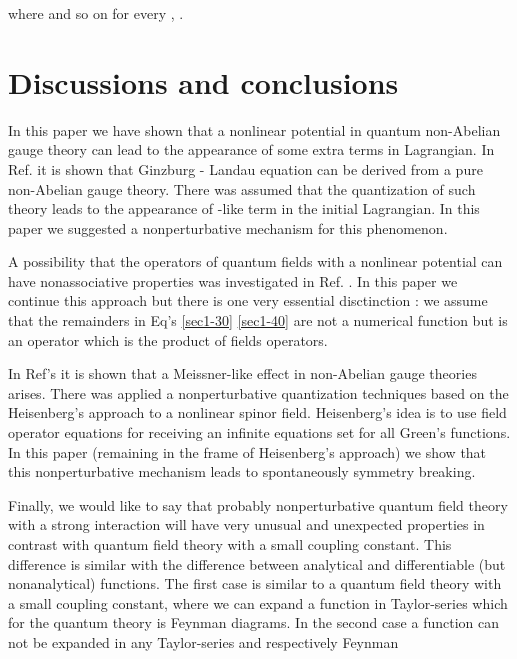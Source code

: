 \documentclass[a4paper,a4paper]{article}
\begin{document}
where \coordHE{} and so on 
for every \coordHE{}, \coordHE{}. 

\section{Discussions and conclusions}

In this paper we have shown that a nonlinear potential in 
quantum non-Abelian gauge theory can lead to the appearance 
of some extra terms in Lagrangian. In Ref. \cite{dzhsin} 
it is shown that Ginzburg - Landau equation can be derived from a pure 
non-Abelian gauge theory. There was assumed that the quantization 
of such theory leads to the appearance of \coordHE{}-like 
term in the initial Lagrangian. In this paper we suggested a 
nonperturbative mechanism for this phenomenon. 
\par 
A possibility that the operators of quantum fields with a nonlinear 
potential can have nonassociative properties was investigated 
in Ref. \cite{dzhsin2} . In this paper we continue this approach 
but there is one very essential disctinction : we assume that 
the remainders in Eq's \eqref{sec1-30} \eqref{sec1-40} are not 
a numerical function 
but is an operator which is the product of fields operators. 
\par
In Ref's \cite{dzhsin1} it is shown that a Meissner-like effect 
in non-Abelian gauge theories arises. There was applied 
a nonperturbative quantization techniques based on the 
Heisenberg's approach to a nonlinear spinor field. 
Heisenberg's idea is to  use field operator 
equations for receiving an infinite 
equations set for all Green's functions. In this paper (remaining in 
the frame of Heisenberg's approach) we show that this nonperturbative 
mechanism leads to spontaneously symmetry breaking. 
\par 
Finally, we would like to say that probably nonperturbative 
quantum field theory with a strong interaction 
will have very unusual and unexpected properties 
in contrast with quantum field theory with a small coupling constant. 
This difference is similar with the difference between analytical 
and differentiable (but nonanalytical) functions. The first case 
is similar to a quantum field theory with a small coupling constant, 
where we can expand a function in Taylor-series which for 
the quantum theory is Feynman diagrams. In the second case a 
function can not be expanded in any Taylor-series and respectively Feynman 
\end{document}
